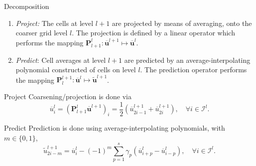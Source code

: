\documentclass{beamer}
\begin{document}
\begin{frame}{Decomposition}
    \begin{enumerate}
        \item[] \textit{Project:} The cells at level $l+1$ are projected
            by means of averaging, onto the coarser grid
            level $l$. The projection is defined by a linear operator
            which performs the mapping $\bm{P}_{l+1}^{l} : \overline{\bm{u}}^{l+1}
            \mapsto \overline{\bm{u}}^{l}$. 
        \item[] \textit{Predict}: Cell averages at level $l+1$
            are predicted by an average-interpolating polynomial constructed
            of cells on level $l$. The prediction operator performs
            the mapping $\bm{P}_{l}^{l+1} : \overline{\bm{u}}^{l} \mapsto
            \tilde{\bm{u}}^{l+1}$. 
    \end{enumerate}
\end{frame}

\begin{frame}{Project}
    Coarsening/projection is done via
    \begin{equation}
        \overline{u}^{l}_{i} = \left( \bm{P}_{l+1}^{l}
        \overline{\bm{u}}^{l+1} \right)_{i} = \frac{1}{2} (
        \overline{u}^{l+1}_{2i-1} + \overline{u}^{l+1}_{2i} ), \quad \forall
        i \in \bm{\mathcal{I}}^{l}.
    \end{equation}
\end{frame}

\begin{frame}{Predict}
    Prediction is done using average-interpolating polynomials, with
    $m\in\{0,1\}$,
    \begin{equation*}
        \tilde{u}_{2i-m}^{l+1} = \overline{u}_{i}^{l} - (-1)^{m} \sum_{p=1}^{s} \gamma_{p} \left(
            \overline{u}^{l}_{i+p} - \overline{u}^{l}_{i-p} \right), \quad \forall i \in
            \bm{\mathcal{I}}^{l}.
        \label{prediction}
    \end{equation*}
\end{frame}
\end{document}
